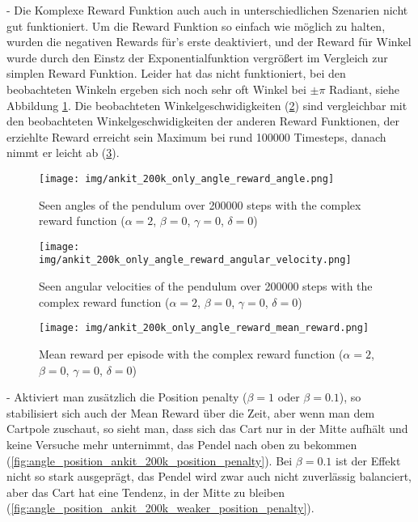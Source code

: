 - Die Komplexe Reward Funktion auch auch in unterschiedlichen Szenarien nicht gut funktioniert. Um die Reward Funktion so einfach wie möglich zu halten, wurden die negativen Rewards für's erste deaktiviert, und der Reward für Winkel wurde durch den Einstz der Exponentialfunktion vergrößert im Vergleich zur simplen Reward Funktion. Leider hat das nicht funktioniert, bei den beobachteten Winkeln ergeben sich noch sehr oft Winkel bei $\pm\pi$ Radiant, siehe Abbildung \ref{fig:angle_ankit_200k_only_angle_reward}. Die beobachteten Winkelgeschwidigkeiten (\ref{fig:angle_velocity_ankit_200k_only_angle_reward}) sind vergleichbar mit den beobachteten Winkelgeschwidigkeiten der anderen Reward Funktionen, der erziehlte Reward erreicht sein Maximum bei rund 100000 Timesteps, danach nimmt er leicht ab (\ref{fig:mean_reward_ankit_200k_only_angle_reward}).
\begin{figure}[htbp]
    \centering
    \texttt{[image: img/ankit\_200k\_only\_angle\_reward\_angle.png]}
    \caption{Seen angles of the pendulum over 200000 steps with the complex reward function ($\alpha=2$, $\beta=0$, $\gamma=0$, $\delta=0$)}
    \label{fig:angle_ankit_200k_only_angle_reward}
\end{figure}
\begin{figure}[htbp]
    \centering
    \texttt{[image: img/ankit\_200k\_only\_angle\_reward\_angular\_velocity.png]}
    \caption{Seen angular velocities of the pendulum over 200000 steps with the complex reward function ($\alpha=2$, $\beta=0$, $\gamma=0$, $\delta=0$)}
    \label{fig:angle_velocity_ankit_200k_only_angle_reward}
\end{figure}
\begin{figure}[htbp]
    \centering
    \texttt{[image: img/ankit\_200k\_only\_angle\_reward\_mean\_reward.png]}
    \caption{Mean reward per episode with the complex reward function ($\alpha=2$, $\beta=0$, $\gamma=0$, $\delta=0$)}
    \label{fig:mean_reward_ankit_200k_only_angle_reward}
\end{figure}
- Aktiviert man zusätzlich die Position penalty ($\beta=1$ oder $\beta=0.1$), so stabilisiert sich auch der Mean Reward über die Zeit, aber wenn man dem Cartpole zuschaut, so sieht man, dass sich das Cart nur in der Mitte aufhält und keine Versuche mehr unternimmt, das Pendel nach oben zu bekommen (\ref{fig:angle_position_ankit_200k_position_penalty}). Bei $\beta=0.1$ ist der Effekt nicht so stark ausgeprägt, das Pendel wird zwar auch nicht zuverlässig balanciert, aber das Cart hat eine Tendenz, in der Mitte zu bleiben (\ref{fig:angle_position_ankit_200k_weaker_position_penalty}).
